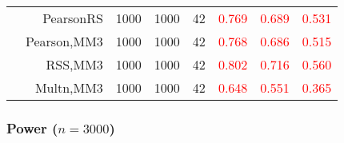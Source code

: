 \documentclass[
]{article}
\begin{document}
\begin{table}[H]
{\begin{tabular}[t]{lrrrrrrr}
\hspace{1em} & PearsonRS & 1000 & 1000 & 42 & \textcolor{red}{0.769} & \textcolor{red}{0.689} & \textcolor{red}{0.531}\\

\hspace{1em} & Pearson,MM3 & 1000 & 1000 & 42 & \textcolor{red}{0.768} & \textcolor{red}{0.686} & \textcolor{red}{0.515}\\

\hspace{1em} & RSS,MM3 & 1000 & 1000 & 42 & \textcolor{red}{0.802} & \textcolor{red}{0.716} & \textcolor{red}{0.560}\\

\hspace{1em} & Multn,MM3 & 1000 & 1000 & 42 & \textcolor{red}{0.648} & \textcolor{red}{0.551} & \textcolor{red}{0.365}\\
\bottomrule
\end{tabular}}
\endgroup{}
\end{table}

\hypertarget{power-n3000}{%
\subsubsection{\texorpdfstring{Power
(\(n=3000\))}{Power (n=3000)}}\label{power-n3000}}
\end{document}
